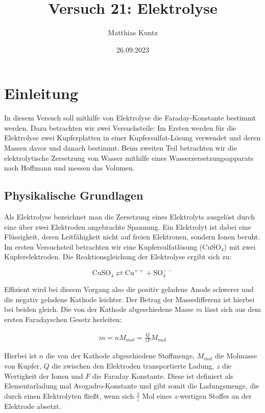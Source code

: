 \documentclass{article}
\title{Versuch 21: Elektrolyse}
\author{Matthias Kuntz}
\date{26.09.2023}
\begin{document}
\maketitle

\section{Einleitung}

In diesem Versuch soll mithilfe von Elektrolyse die Faraday-Konstante bestimmt werden. Dazu betrachten wir zwei Versuchsteile: Im Ersten werden für die Elektrolyse zwei Kupferplatten in einer Kupfersulfat-Lösung verwendet und deren Massen davor und danach bestimmt. Beim zweiten Teil betrachten wir die elektrolytische Zersetzung von Wasser mithilfe eines Wasserzersetzungsapparats nach Hoffmann und messen das Volumen.

\subsection{Physikalische Grundlagen}

Als Elektrolyse bezeichnet man die Zersetzung eines Elektrolyts ausgelöst durch eine über zwei Elektroden angebrachte Spannung. Ein Elektrolyt ist dabei eine Flüssigkeit, deren Leitfähigkeit nicht auf freien Elektronen, sondern Ionen beruht. Im ersten Versuchsteil betrachten wir eine Kupfersulfatlösung (CuSO$_4$) mit zwei Kupferelektroden. Die Reaktionsgleichung der Elektrolyse ergibt sich zu:

\begin{equation}
    \text{CuSO}_4 \rightleftarrows \text{Cu}^{++} + \text{SO}_4^{--}
    \label{eq:elektrolyse1}
\end{equation}

Effizient wird bei diesem Vorgang also die positiv geladene Anode schwerer und die negativ geladene Kathode leichter. Der Betrag der Massedifferenz ist hierbei bei beiden gleich. Die von der Kathode abgeschiedene Masse $m$ lässt sich aus dem ersten Faradayschen Gesetz herleiten: 

\begin{equation}
    \begin{split}
        m = n M_{mol} = \frac{Q}{zF} M_{mol}
    \end{split}
    \label{eq:masse}
\end{equation}

Hierbei ist $n$ die von der Kathode abgeschiedene Stoffmenge, $M_{mol}$ die Molmasse von Kupfer, $Q$ die zwischen den Elektroden transportierte Ladung, $z$ die Wertigkeit der Ionen und $F$ die Faraday Konstante. Diese ist definiert als Elementarladung mal Avogadro-Konstante und gibt somit die Ladungsmenge, die durch einen Elektrolyten fließt, wenn sich $\frac{1}{z}$ Mol eines $z$-wertigen Stoffes an der Elektrode absetzt.
\end{document}
